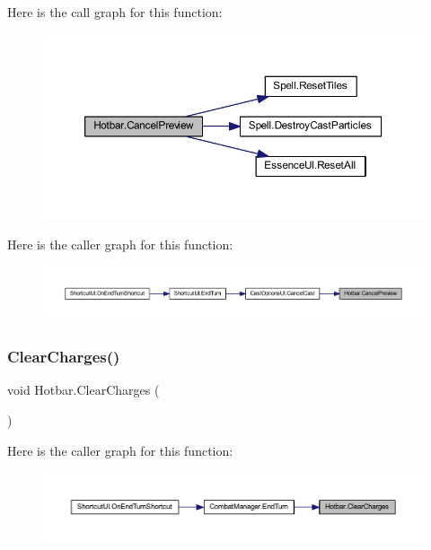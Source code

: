 Here is the call graph for this function\+:\nopagebreak
\begin{figure}[H]
\begin{center}
\leavevmode
\includegraphics[width=350pt]{class_hotbar_a0c213365074f45fd1b1010eabe3f3d4d_cgraph}
\end{center}
\end{figure}
Here is the caller graph for this function\+:\nopagebreak
\begin{figure}[H]
\begin{center}
\leavevmode
\includegraphics[width=350pt]{class_hotbar_a0c213365074f45fd1b1010eabe3f3d4d_icgraph}
\end{center}
\end{figure}
\mbox{\label{class_hotbar_ab54a6d27db19b4ed21014a782d74b3d1}} 
\subsubsection{\texorpdfstring{ClearCharges()}{ClearCharges()}}
{\footnotesize\ttfamily void Hotbar.\+Clear\+Charges (\begin{DoxyParamCaption}{ }\end{DoxyParamCaption})}

Here is the caller graph for this function\+:\nopagebreak
\begin{figure}[H]
\begin{center}
\leavevmode
\includegraphics[width=350pt]{class_hotbar_ab54a6d27db19b4ed21014a782d74b3d1_icgraph}
\end{center}
\end{figure}
\mbox{\label{class_hotbar_a535ef71789d10c417b86bdd194e3e5b7}} 
